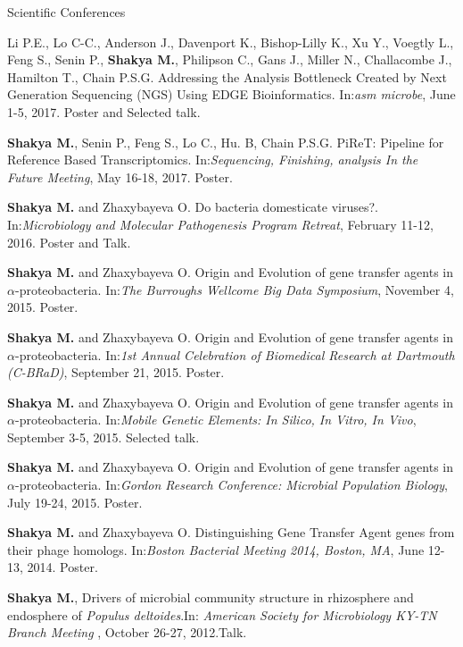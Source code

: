 \documentclass{resume} %
\begin{document}
\begin{rSection}{Scientific Conferences}

\item Li P.E., Lo C-C., Anderson J., Davenport K., Bishop-Lilly K., Xu Y., Voegtly L., Feng S., Senin P., \textbf{Shakya M.}, Philipson C., Gans J., Miller N., Challacombe J., Hamilton T., Chain P.S.G. Addressing the Analysis Bottleneck Created by Next Generation Sequencing (NGS) Using EDGE Bioinformatics. In:\emph{asm microbe}, June 1-5, 2017. Poster and Selected talk.

\item \textbf{Shakya M.}, Senin P., Feng S., Lo C., Hu. B, Chain P.S.G. PiReT: Pipeline for Reference Based Transcriptomics. In:\emph{Sequencing, Finishing, analysis In the Future Meeting}, May 16-18, 2017. Poster.

\item \textbf{Shakya M.} and Zhaxybayeva O. Do bacteria domesticate viruses?. In:\emph{Microbiology and Molecular Pathogenesis Program Retreat}, February 11-12, 2016. Poster and Talk.

\item \textbf{Shakya M.} and Zhaxybayeva O. Origin and Evolution of gene transfer agents in $\alpha$-proteobacteria. In:\emph{The Burroughs Wellcome Big Data Symposium}, November 4, 2015. Poster.

\item \textbf{Shakya M.} and Zhaxybayeva O. Origin and Evolution of gene transfer agents in $\alpha$-proteobacteria. In:\emph{1st Annual Celebration of Biomedical Research at Dartmouth (C-BRaD)}, September 21, 2015. Poster.

\item \textbf{Shakya M.} and Zhaxybayeva O. Origin and Evolution of gene transfer agents in $\alpha$-proteobacteria. In:\emph{Mobile Genetic Elements: In Silico, In Vitro, In Vivo}, September 3-5, 2015. Selected talk.

\item \textbf{Shakya M.} and Zhaxybayeva O. Origin and Evolution of gene transfer agents in $\alpha$-proteobacteria. In:\emph{Gordon Research Conference: Microbial Population Biology}, July 19-24, 2015. Poster.

\item \textbf{Shakya M.} and Zhaxybayeva O. Distinguishing Gene Transfer Agent genes from their phage homologs. In:\emph{Boston Bacterial Meeting 2014, Boston, MA}, June 12-13, 2014. Poster.

\item \textbf{Shakya M.}, Drivers of microbial community structure in rhizosphere and endosphere of \textit{Populus deltoides}.In: \emph{American Society for Microbiology KY-TN Branch Meeting }, October 26-27, 2012.Talk.


\end{rSection}
\end{document}
